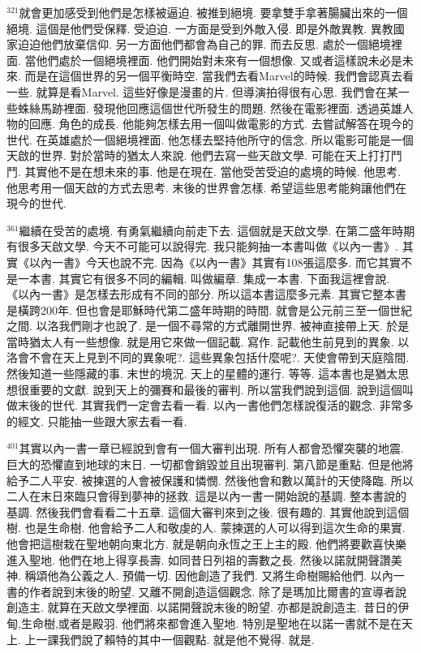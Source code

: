 \documentclass{book}
\begin{document}
$^{321}$就會更加感受到他們是怎樣被逼迫.
被推到絕境.
要拿雙手拿著腸臟出來的一個絕境.
這個是他們受保釋.
受迫迫.
一方面是受到外敵入侵.
即是外敵異教.
異教國家迫迫他們放棄信仰.
另一方面他們都會為自己的罪.
而去反思.
處於一個絕境裡面.
當他們處於一個絕境裡面.
他們開始對未來有一個想像.
又或者這樣說未必是未來.
而是在這個世界的另一個平衡時空.
當我們去看Marvel的時候.
我們會認真去看一些.
就算是看Marvel.
這些好像是漫畫的片.
但導演拍得很有心思.
我們會在某一些蛛絲馬跡裡面.
發現他回應這個世代所發生的問題.
然後在電影裡面.
透過英雄人物的回應.
角色的成長.
他能夠怎樣去用一個叫做電影的方式.
去嘗試解答在現今的世代.
在英雄處於一個絕境裡面.
他怎樣去堅持他所守的信念.
所以電影可能是一個天啟的世界.
對於當時的猶太人來說.
他們去寫一些天啟文學.
可能在天上打打鬥鬥.
其實他不是在想未來的事.
他是在現在.
當他受苦受迫的處境的時候.
他思考.
他思考用一個天啟的方式去思考.
末後的世界會怎樣.
希望這些思考能夠讓他們在現今的世代.

$^{361}$繼續在受苦的處境.
有勇氣繼續向前走下去.
這個就是天啟文學.
在第二盛年時期有很多天啟文學.
今天不可能可以說得完.
我只能夠抽一本書叫做《以內一書》.
其實《以內一書》今天也說不完.
因為《以內一書》其實有108張這麼多.
而它其實不是一本書.
其實它有很多不同的編輯.
叫做編章.
集成一本書.
下面我這裡會說.
《以內一書》是怎樣去形成有不同的部分.
所以這本書這麼多元素.
其實它整本書是橫跨200年.
但也會是耶穌時代第二盛年時期的時間.
就會是公元前三至一個世紀之間.
以洛我們剛才也說了.
是一個不尋常的方式離開世界.
被神直接帶上天.
於是當時猶太人有一些想像.
就是用它來做一個記載.
寫作.
記載他生前見到的異象.
以洛會不會在天上見到不同的異象呢?.
這些異象包括什麼呢?.
天使會帶到天庭陰間.
然後知道一些隱藏的事.
末世的境況.
天上的星體的運行.
等等.
這本書也是猶太思想很重要的文獻.
說到天上的彌賽和最後的審判.
所以當我們說到這個.
說到這個叫做末後的世代.
其實我們一定會去看一看.
以內一書他們怎樣說復活的觀念.
非常多的經文.
只能抽一些跟大家去看一看.

$^{401}$其實以內一書一章已經說到會有一個大審判出現.
所有人都會恐懼突襲的地震.
巨大的恐懼直到地球的末日.
一切都會銷毀並且出現審判.
第八節是重點.
但是他將給予二人平安.
被揀選的人會被保護和憐憫.
然後他會和數以萬計的天使降臨.
所以二人在末日來臨只會得到夢神的拯救.
這是以內一書一開始說的基調.
整本書說的基調.
然後我們會看看二十五章.
這個大審判來到之後.
很有趣的.
其實他說到這個樹.
也是生命樹.
他會給予二人和敬虔的人.
蒙揀選的人可以得到這次生命的果實.
他會把這樹栽在聖地朝向東北方.
就是朝向永恆之王上主的殿.
他們將要歡喜快樂進入聖地.
他們在地上得享長壽.
如同昔日列祖的壽數之長.
然後以諾就開聲讚美神.
稱頌他為公義之人.
預備一切.
因他創造了我們.
又將生命樹賜給他們.
以內一書的作者說到末後的盼望.
又離不開創造這個觀念.
除了是瑪加比爾書的宣導者說創造主.
就算在天啟文學裡面.
以諾開聲說末後的盼望.
亦都是說創造主.
昔日的伊甸,生命樹,或者是殿羽.
他們將來都會進入聖地.
特別是聖地在以諾一書就不是在天上.
上一課我們說了賴特的其中一個觀點.
就是他不覺得.
就是.
\end{document}
